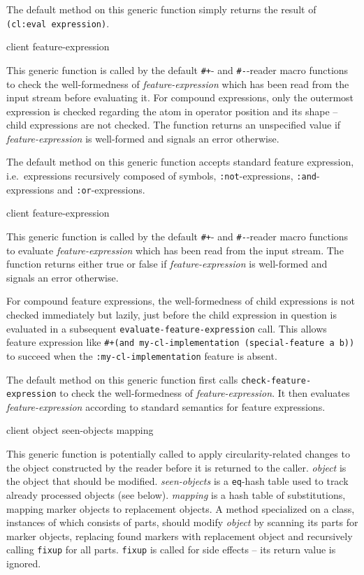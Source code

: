 The default method on this generic function simply returns the result
of \texttt{(cl:eval expression)}.

 {client feature-expression}

This generic function is called by the default \texttt{\#+}- and
\texttt{\#-}-reader macro functions to check the well-formedness of
\textit{feature-expression} which has been read from the input stream
before evaluating it.  For compound expressions, only the outermost
expression is checked regarding the atom in operator position and its
shape -- child expressions are not checked.  The function returns an
unspecified value if \textit{feature-expression} is well-formed and
signals an error otherwise.

The default method on this generic function accepts standard
\commonlisp{} feature expression, i.e.\ expressions recursively
composed of symbols, \texttt{:not}-expressions,
\texttt{:and}-expressions and \texttt{:or}-expressions.

 {client feature-expression}

This generic function is called by the default \texttt{\#+}- and
\texttt{\#-}-reader macro functions to evaluate
\textit{feature-expression} which has been read from the input stream.
The function returns either true or false if
\textit{feature-expression} is well-formed and signals an error
otherwise.

For compound feature expressions, the well-formedness of child
expressions is not checked immediately but lazily, just before the
child expression in question is evaluated in a subsequent
\texttt{evaluate-feature-expression} call.  This allows feature
expression like \texttt{\#+(and my-cl-implementation (special-feature
  a b))} to succeed when the \texttt{:my-cl-implementation} feature is
absent.

The default method on this generic function first calls
\texttt{check-feature-expression} to check the well-formedness of
\textit{feature-expression}.  It then evaluates
\textit{feature-expression} according to standard \commonlisp{}
semantics for feature expressions.

 {client object seen-objects mapping}

This generic function is potentially called to apply
circularity-related changes to the object constructed by the reader
before it is returned to the caller.  \textit{object} is the object
that should be modified.  \textit{seen-objects} is a \texttt{eq}-hash
table used to track already processed objects (see below).
\textit{mapping} is a hash table of substitutions, mapping marker
objects to replacement objects.  A method specialized on a class,
instances of which consists of parts, should modify \textit{object} by
scanning its parts for marker objects, replacing found markers with
replacement object and recursively calling \texttt{fixup} for all
parts.  \texttt{fixup} is called for side effects -- its return value
is ignored.

